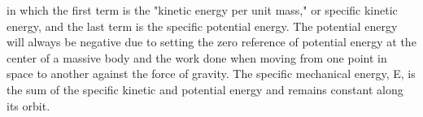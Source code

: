 \documentclass[conf]{new-aiaa}
\begin{document}
in which the first term is the "kinetic energy per unit mass," or specific kinetic energy, and the last term is the specific potential energy.  The potential energy will always be negative due to setting the zero reference of potential energy at the center of a massive body and the work done when moving from one point in space to another against the force of gravity. The specific mechanical energy, E, is the sum of the specific kinetic and potential energy and remains constant along its orbit.


%
%
%
%
%
%
\end{document}
